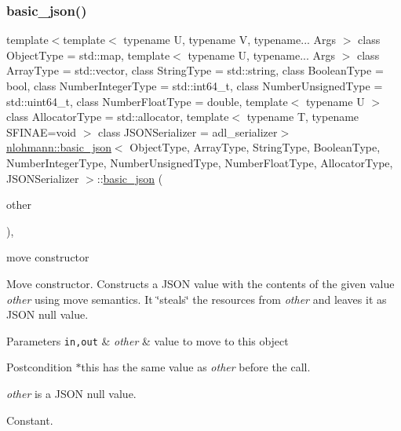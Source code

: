 \subsubsection{\texorpdfstring{basic\+\_\+json()}{basic\_json()}\hspace{0.1cm}{\footnotesize\ttfamily [8/8]}}
{\footnotesize\ttfamily template$<$template$<$ typename U, typename V, typename... Args $>$ class Object\+Type = std\+::map, template$<$ typename U, typename... Args $>$ class Array\+Type = std\+::vector, class String\+Type  = std\+::string, class Boolean\+Type  = bool, class Number\+Integer\+Type  = std\+::int64\+\_\+t, class Number\+Unsigned\+Type  = std\+::uint64\+\_\+t, class Number\+Float\+Type  = double, template$<$ typename U $>$ class Allocator\+Type = std\+::allocator, template$<$ typename T, typename S\+F\+I\+N\+A\+E=void $>$ class J\+S\+O\+N\+Serializer = adl\+\_\+serializer$>$ \\
\mbox{\hyperlink{classnlohmann_1_1basic__json}{nlohmann\+::basic\+\_\+json}}$<$ Object\+Type, Array\+Type, String\+Type, Boolean\+Type, Number\+Integer\+Type, Number\+Unsigned\+Type, Number\+Float\+Type, Allocator\+Type, J\+S\+O\+N\+Serializer $>$\+::\mbox{\hyperlink{classnlohmann_1_1basic__json}{basic\+\_\+json}} (\begin{DoxyParamCaption}\item[{\mbox{\hyperlink{classnlohmann_1_1basic__json}{basic\+\_\+json}}$<$ Object\+Type, Array\+Type, String\+Type, Boolean\+Type, Number\+Integer\+Type, Number\+Unsigned\+Type, Number\+Float\+Type, Allocator\+Type, J\+S\+O\+N\+Serializer $>$ \&\&}]{other }\end{DoxyParamCaption})\hspace{0.3cm}{\ttfamily [inline]}, {\ttfamily [noexcept]}}



move constructor 

Move constructor. Constructs a J\+S\+ON value with the contents of the given value {\itshape other} using move semantics. It \char`\"{}steals\char`\"{} the resources from {\itshape other} and leaves it as J\+S\+ON null value.


\begin{DoxyParams}[1]{Parameters}
\mbox{\tt in,out}  & {\em other} & value to move to this object\\
\hline
\end{DoxyParams}
\begin{DoxyPostcond}{Postcondition}
{\ttfamily $\ast$this} has the same value as {\itshape other} before the call. 

{\itshape other} is a J\+S\+ON null value.
\end{DoxyPostcond}
Constant.

